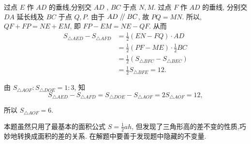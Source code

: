 \documentclass{March}
\begin{document}
\begin{solution}
	过点 $E$ 作 $A D$ 的垂线,分别交 $A D$ ,  $B C$ 于点 $N ,  M$. 过点 $F$ 作 $A D$ 的垂线, 分别交 $D A$ 延长线及 $B C$ 于点 $Q ,  P$.
	由于 $A D\kern 0.56em/\kern -0.8em /\kern 0.56em B C$, 故 $P Q=M N$.
	所以, $Q F+F P=N E+E M$, 即 $F P-E M=N E-Q F$. 从而
	$$
		\begin{aligned}
			S_{\triangle A E D}-S_{\triangle A F D} & =\frac{1}{2}(E N-F Q) \cdot A D                                  \\
			                                        & =\frac{1}{2}(P F-M E) \cdot \frac{1}{2} B C                      \\
			                                        & =\frac{1}{2}\left(S_{\triangle B F C}-S_{\triangle B E C}\right) \\
			                                        & =\frac{1}{2} S_{\triangle B F E}=12 .
		\end{aligned}
	$$

	由 $S_{\triangle A O F}: S_{\triangle D O E}=1: 3$, 知
	$$
		S_{\triangle A E D}-S_{\triangle A F D}=S_{\triangle D O E}-S_{\triangle A O F}=2 S_{\triangle A O F}=12,
	$$

	所以 $S_{\triangle A O F}=6$.
\end{solution}
\begin{note}
	本题虽然只用了最基本的面积公式 $S=\frac{1}{2} a h$, 但发现了三角形高的差不变的性质,巧妙地转换成面积的差的关系. 在解题中要善于发现题中隐藏的不变量.
\end{note}
\end{document}
